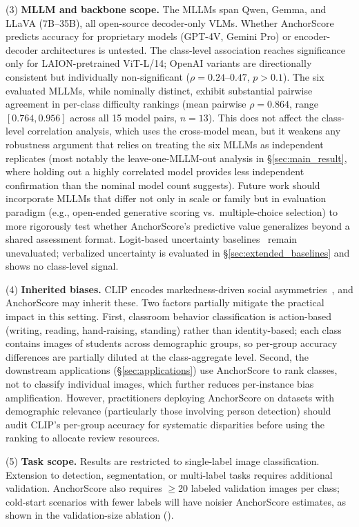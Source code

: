 \documentclass[a4paper,fleqn]{cas-sc}
\begin{document}
(3) \textbf{MLLM and backbone scope.} The MLLMs span Qwen, Gemma, and LLaVA (7B--35B), all open-source decoder-only VLMs. Whether AnchorScore predicts accuracy for proprietary models (GPT-4V, Gemini Pro) or encoder-decoder architectures is untested. The class-level association reaches significance only for LAION-pretrained ViT-L/14; OpenAI variants are directionally consistent but individually non-significant ($\rho=0.24$--$0.47$, $p>0.1$). The six evaluated MLLMs, while nominally distinct, exhibit substantial pairwise agreement in per-class difficulty rankings (mean pairwise $\rho=0.864$, range $[0.764, 0.956]$ across all 15 model pairs, $n=13$). This does not affect the class-level correlation analysis, which uses the cross-model mean, but it weakens any robustness argument that relies on treating the six MLLMs as independent replicates (most notably the leave-one-MLLM-out analysis in \S\ref{sec:main_result}, where holding out a highly correlated model provides less independent confirmation than the nominal model count suggests). Future work should incorporate MLLMs that differ not only in scale or family but in evaluation paradigm (e.g., open-ended generative scoring vs.\ multiple-choice selection) to more rigorously test whether AnchorScore's predictive value generalizes beyond a shared assessment format. Logit-based uncertainty baselines~\cite{kadavath2022language} remain unevaluated; verbalized uncertainty is evaluated in \S\ref{sec:extended_baselines} and shows no class-level signal.

(4) \textbf{Inherited biases.} CLIP encodes markedness-driven social asymmetries~\cite{wolfe2022clip}, and AnchorScore may inherit these. Two factors partially mitigate the practical impact in this setting. First, classroom behavior classification is action-based (writing, reading, hand-raising, standing) rather than identity-based; each class contains images of students across demographic groups, so per-group accuracy differences are partially diluted at the class-aggregate level. Second, the downstream applications (\S\ref{sec:applications}) use AnchorScore to rank classes, not to classify individual images, which further reduces per-instance bias amplification. However, practitioners deploying AnchorScore on datasets with demographic relevance (particularly those involving person detection) should audit CLIP's per-group accuracy for systematic disparities before using the ranking to allocate review resources.

(5) \textbf{Task scope.} Results are restricted to single-label image classification. Extension to detection, segmentation, or multi-label tasks requires additional validation. AnchorScore also requires $\geq$20 labeled validation images per class; cold-start scenarios with fewer labels will have noisier AnchorScore estimates, as shown in the validation-size ablation ().
\end{document}
